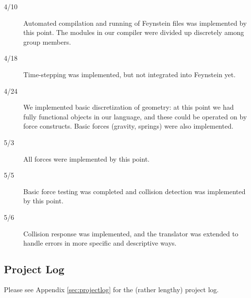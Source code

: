 \begin{description}
\item[4/10] Automated compilation and running of Feynstein files was
  implemented by this point. The modules in our compiler were divided
  up discretely among group members.

\item[4/18] Time-stepping was implemented, but not integrated into
  Feynstein yet.

\item[4/24] We implemented basic discretization of geometry: at this
  point we had fully functional objects in our language, and these
  could be operated on by force constructs. Basic forces (gravity,
  springs) were also implemented.

\item[5/3] All forces were implemented by this point.

\item[5/5] Basic force testing was completed and collision detection
  was implemented by this point.

\item[5/6] Collision response was implemented, and the translator was
  extended to handle errors in more specific and descriptive ways.
\end{description}
\subsection{Project Log}
Please see Appendix \ref{sec:projectlog} for the (rather lengthy)
project log.
